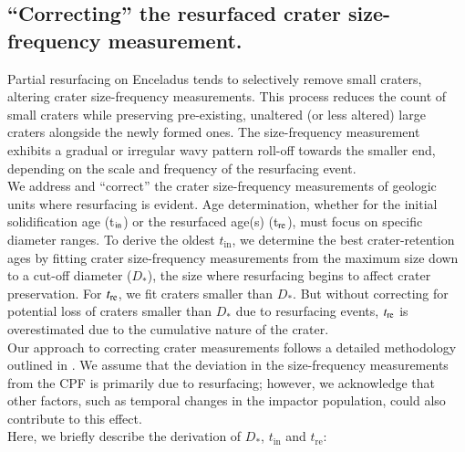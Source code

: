 \documentclass[preprint,12pt,3p,times,authoryear]{elsarticle}
\begin{document}
\subsection{``Correcting'' the resurfaced crater size-frequency measurement.}
\label{app:correction}
Partial resurfacing on Enceladus tends to selectively remove small craters, altering crater size-frequency measurements. This process reduces the count of small craters while preserving pre-existing, unaltered (or less altered) large craters alongside the newly formed ones. The size-frequency measurement exhibits a gradual or irregular wavy pattern roll-off towards the smaller end, depending on the scale and frequency of the resurfacing event.\\

We address and ``correct'' the crater size-frequency measurements of geologic units where resurfacing is evident. Age determination, whether for the initial solidification age (t$_{\rm in}$) or the resurfaced age(s) (t$_{\rm re}$), must focus on specific diameter ranges. To derive the oldest $t_{\text{in}}$, we determine the best crater-retention ages by fitting crater size-frequency measurements from the maximum size down to a cut-off diameter ($D_*$), the size where resurfacing begins to affect crater preservation. For $t_{\rm re}$, we fit craters smaller than $D_*$. But without correcting for potential loss of craters smaller than $D_*$ due to resurfacing events, $t_{\rm re}$ is overestimated due to the cumulative nature of the crater.\\

Our approach to correcting crater measurements follows a detailed methodology outlined in \citet{Michael2010}. We assume that the deviation in the size-frequency measurements from the CPF is primarily due to resurfacing; however, we acknowledge that other factors, such as temporal changes in the impactor population, could also contribute to this effect.\\

Here, we briefly describe the derivation of $D_*$, $t_{\text{in}}$ and $t_{\text{re}}$:
\end{document}
